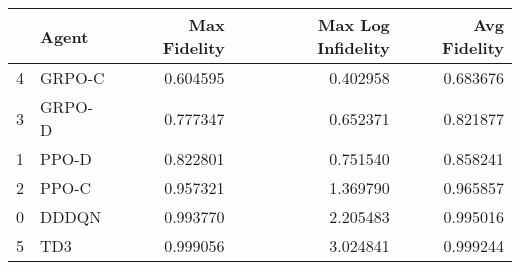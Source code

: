 \begin{tabular}{llrrr}
\toprule
 & Agent & Max Fidelity & Max Log Infidelity & Avg Fidelity \\
\midrule
4 & GRPO-C & 0.604595 & 0.402958 & 0.683676 \\
3 & GRPO-D & 0.777347 & 0.652371 & 0.821877 \\
1 & PPO-D & 0.822801 & 0.751540 & 0.858241 \\
2 & PPO-C & 0.957321 & 1.369790 & 0.965857 \\
0 & DDDQN & 0.993770 & 2.205483 & 0.995016 \\
5 & TD3 & 0.999056 & 3.024841 & 0.999244 \\
\bottomrule
\end{tabular}

